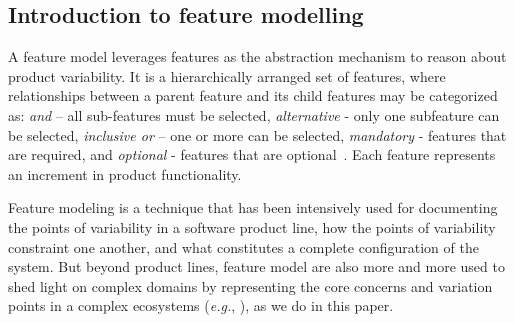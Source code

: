 \subsection{Introduction to feature modelling}
A feature model leverages features as the abstraction mechanism to reason about product variability. It is a hierarchically arranged set of features, where relationships between a parent feature and its child features may be categorized as: \textit{and} – all sub-features must be selected, \textit{alternative} - only one subfeature can be selected, \textit{inclusive or} – one or more can be selected, \textit{mandatory} - features that are required, and \textit{optional} - features that are optional~\cite{kang1998-FeatureModel}.  Each feature represents an increment in product functionality. 

Feature modeling is a technique that has been intensively used for documenting the points of variability in a software product line, how the points of variability constraint one another, and what constitutes a complete configuration of the system. 
But beyond product lines, feature model are also more and more used to shed light on complex domains by representing the core concerns and variation points in a complex ecosystems (\textit{e.g.}, \cite{DBLP:journals/sosym/BruneliereBCW19}), as we do in this paper.




